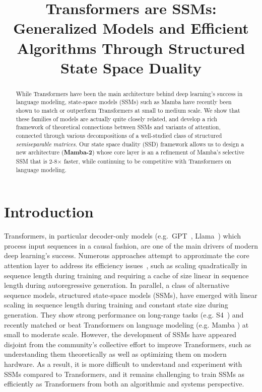 \title{Transformers are SSMs: Generalized Models and Efficient Algorithms Through Structured State Space Duality}

\begin{abstract}

  While Transformers have been the main architecture behind deep learning's success in language modeling, state-space models (SSMs) such as Mamba have recently been shown to match or outperform Transformers at small to medium scale. We show that these families of models are actually quite closely related, and develop a rich framework of theoretical connections between SSMs and variants of attention, connected through various decompositions of a well-studied class of structured \emph{semiseparable matrices}. Our state space duality (SSD) framework allows us to design a new architecture (\textbf{Mamba-2}) whose core layer is an a refinement of Mamba's selective SSM that is 2-8$\times$ faster, while continuing to be competitive with Transformers on language modeling.
\end{abstract}

\section{Introduction}
\label{sec:intro}

Transformers, in particular decoder-only models (e.g.\ GPT~\citep{brown2020language}, Llama~\citep{touvron2023llama}) which process input sequences in a causal fashion, are one of the main drivers of modern deep learning's success. Numerous approaches attempt to approximate the core attention layer to address its efficiency issues~\citep{tay2022efficient}, such as scaling quadratically in sequence length during training and requiring a cache of size linear in sequence length during autoregressive generation. In parallel, a class of alternative sequence models, structured state-space models (SSMs), have emerged with linear scaling in sequence length during training and constant state size during generation. They show strong performance on long-range tasks (e.g. S4~\citep{gu2022efficiently}) and recently matched or beat Transformers on language modeling (e.g. Mamba \citep{gu2023mamba}) at small to moderate scale. However, the development of SSMs have appeared disjoint from the community's collective effort to improve Transformers, such as understanding them theoretically as well as optimizing them on modern hardware. As a result, it is more difficult to understand and experiment with SSMs compared to Transformers, and it remains challenging to train SSMs as efficiently as Transformers from both an algorithmic and systems perspective.

